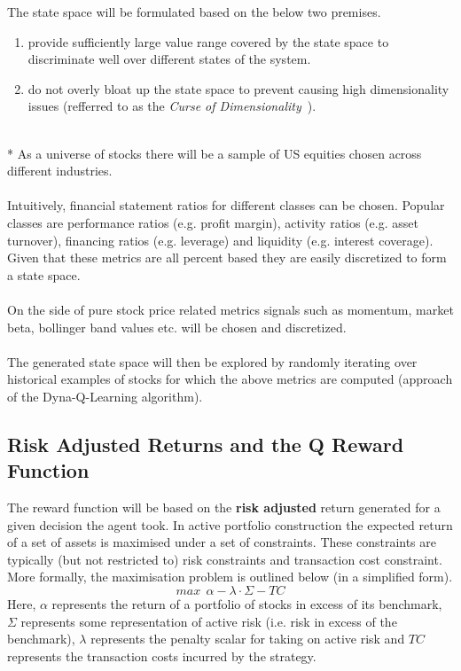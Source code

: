 \documentclass[dvips,12pt]{article}
\begin{document}
The state space will be formulated based on the below two premises.
\begin{enumerate}
	\item provide sufficiently large value range covered by the state space to discriminate well over different states of the system.
	\item do not overly bloat up the state space to prevent causing high dimensionality issues (refferred to as the \emph{Curse of Dimensionality}~\cite{rojas2015}).
\end{enumerate}
~\\*
As a universe of stocks there will be a sample of US equities chosen across different industries.
\\\\
Intuitively, financial statement ratios for different classes can be chosen. Popular classes are performance ratios (e.g. profit margin), activity ratios (e.g. asset turnover), financing ratios (e.g. leverage) and liquidity (e.g. interest coverage). Given that these metrics are all percent based they are easily discretized to form a state space.
\\\\
On the side of pure stock price related metrics signals such as momentum, market beta, bollinger band values etc. will be chosen and discretized.
\\\\
The generated state space will then be explored by randomly iterating over historical examples of stocks for which the above metrics are computed (approach of the Dyna-Q-Learning algorithm). 

\subsection*{Risk Adjusted Returns and the Q Reward Function}
The reward function will be based on the \textbf{risk adjusted} return generated for a given decision the agent took.
In active portfolio construction the expected return of a set of assets is maximised under a set of constraints. These constraints are typically (but not restricted to) risk constraints and transaction cost constraint. More formally, the maximisation problem is outlined below (in a simplified form)\cite{grinoldkahn1999}.
\begin{equation}
	max~~\alpha - \lambda \cdot \Sigma - TC
\end{equation}
Here, $\alpha$ represents the return of a portfolio of stocks in excess of its benchmark, $\Sigma$ represents some representation of active risk (i.e. risk in excess of the benchmark), $\lambda$ represents the penalty scalar for taking on active risk and $TC$ represents the transaction costs incurred by the strategy.
\end{document}
